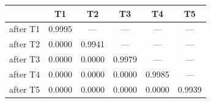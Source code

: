 \begin{tabular}{@{}lccccc@{}}
\toprule
& \textbf{T1} & \textbf{T2} & \textbf{T3} & \textbf{T4} & \textbf{T5} \\
\midrule
after T1 & 0.9995 & --- & --- & --- & --- \\
after T2 & 0.0000 & 0.9941 & --- & --- & --- \\
after T3 & 0.0000 & 0.0000 & 0.9979 & --- & --- \\
after T4 & 0.0000 & 0.0000 & 0.0000 & 0.9985 & --- \\
after T5 & 0.0000 & 0.0000 & 0.0000 & 0.0000 & 0.9939 \\
\bottomrule
\end{tabular}
